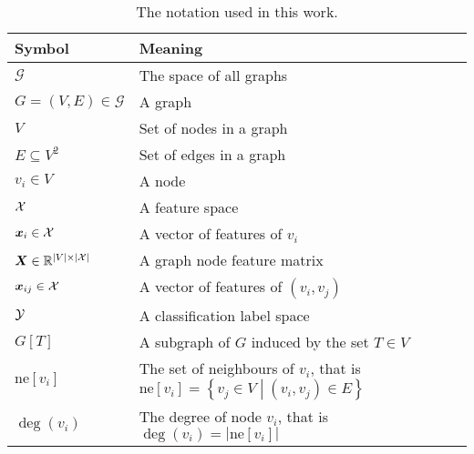 \begin{table}
	\begin{ctucolortab}
		\begin{tabular}{ll}
			\toprule
			\textbf{Symbol} & \textbf{Meaning} \\
			\midrule
			\( \mathcal{G} \) & The space of all graphs \\
			\( G = \left( V, E \right) \in \mathcal{G} \) & A graph \\
			\( V \) & Set of nodes in a graph \\
			\( E \subseteq V^2 \) & Set of edges in a graph \\
			\( v_i \in V \) & A node \\
			\( \mathcal{X} \) & A feature space \\
			\( \bm{x}_i \in \mathcal{X} \) & A vector of features of \( v_i \) \\
			\( \bm{X} \in \mathbb{R}^{\left\lvert V \right\rvert \times \left\lvert \mathcal{X} \right\rvert} \) & A graph node feature matrix	\\
			\( \bm{x}_{ij} \in \mathcal{X} \) & A vector of features of \( \left( v_i, v_j \right) \) \\
			\( \mathcal{Y} \) & A classification label space \\
			\( G \left[ T \right] \) & A subgraph of \( G \) induced by the set \( T \in V \) \\
			\( \mathrm{ne}[v_i] \) & The set of neighbours of \( v_i \), that is \( \mathrm{ne}[v_i] = \left\{ v_j \in V \middle| \left( v_i, v_j \right) \in E \right\} \) \\
			\( \deg \left( v_i \right) \) & The degree of node \( v_i \), that is \( \deg \left( v_i \right) = \left\lvert \mathrm{ne}[v_i] \right\rvert \) \\
			\bottomrule
		\end{tabular}
	\end{ctucolortab}
	\caption{The notation used in this work.}
	\label{tab:notation}
\end{table}
